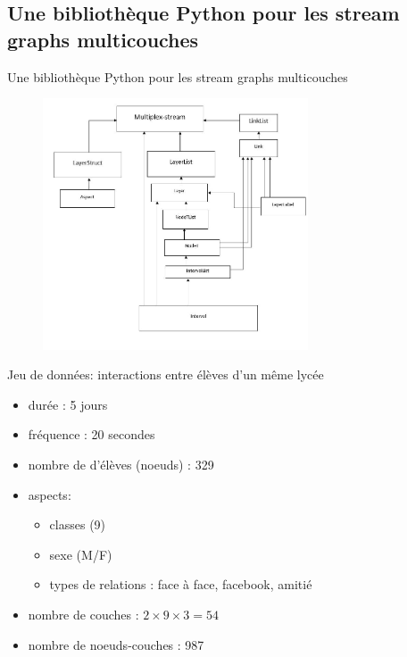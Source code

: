 \documentclass[15pt]{beamer}
\def \stgms {stream graphs multicouches}
\begin{document}
\subsection{Une bibliothèque Python pour les \stgms{}}
\begin{frame}{Une bibliothèque Python pour les \stgms{}}
    \begin{figure}
        \centering
        \includegraphics[width=0.7\textwidth]{img/codeStructure.JPG}
        \label{fig:my_label}
    \end{figure}
\end{frame}
\begin{frame}{Jeu de données: interactions entre élèves d'un même lycée}
    \begin{itemize}
        \item durée : 5 jours
        \item fréquence : 20 secondes
        \item nombre de d'élèves (noeuds) : 329
        \item aspects: \begin{itemize}
            \item classes (9)
            \item sexe (M/F)
            \item types de relations : face à face, facebook, amitié
        \end{itemize}
        \item nombre de couches : $2\times 9 \times 3 = 54$
        \item nombre de noeuds-couches : 987
    \end{itemize}
\end{frame}
\end{document}

